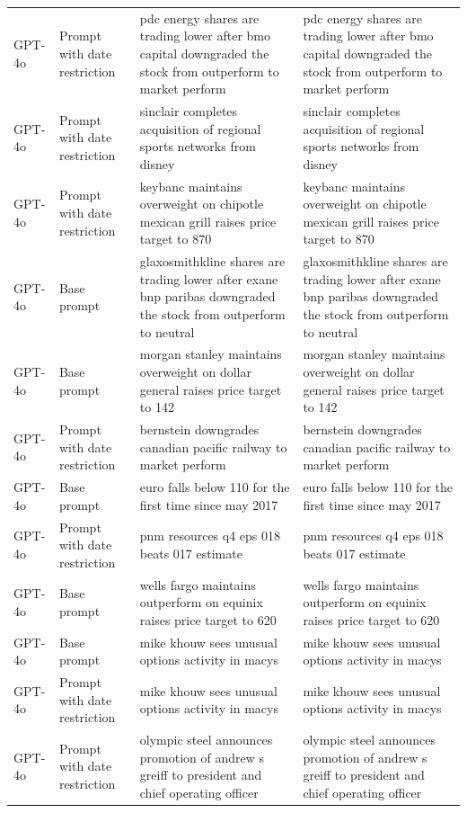 \begin{longtable}{>{\raggedright\arraybackslash}p{1.4cm}>{\raggedright\arraybackslash}p{1.4cm}>{\raggedright\arraybackslash}p{5.5cm}>{\raggedright\arraybackslash}p{5.5cm}}
GPT-4o & Prompt with date restriction & pdc energy shares are trading lower after bmo capital downgraded the stock from outperform to market perform & pdc energy shares are trading lower after bmo capital downgraded the stock from outperform to market perform\\
GPT-4o & Prompt with date restriction & sinclair completes acquisition of regional sports networks from disney & sinclair completes acquisition of regional sports networks from disney\\
GPT-4o & Prompt with date restriction & keybanc maintains overweight on chipotle mexican grill raises price target to 870 & keybanc maintains overweight on chipotle mexican grill raises price target to 870\\
GPT-4o & Base prompt & glaxosmithkline shares are trading lower after exane bnp paribas downgraded the stock from outperform to neutral & glaxosmithkline shares are trading lower after exane bnp paribas downgraded the stock from outperform to neutral\\
GPT-4o & Base prompt & morgan stanley maintains overweight on dollar general raises price target to 142 & morgan stanley maintains overweight on dollar general raises price target to 142\\
GPT-4o & Prompt with date restriction & bernstein downgrades canadian pacific railway to market perform & bernstein downgrades canadian pacific railway to market perform\\
GPT-4o & Base prompt & euro falls below 110 for the first time since may 2017 & euro falls below 110 for the first time since may 2017\\
GPT-4o & Prompt with date restriction & pnm resources q4 eps 018 beats 017 estimate & pnm resources q4 eps 018 beats 017 estimate\\
GPT-4o & Base prompt & wells fargo maintains outperform on equinix raises price target to 620 & wells fargo maintains outperform on equinix raises price target to 620\\
GPT-4o & Base prompt & mike khouw sees unusual options activity in macys & mike khouw sees unusual options activity in macys\\
GPT-4o & Prompt with date restriction & mike khouw sees unusual options activity in macys & mike khouw sees unusual options activity in macys\\
GPT-4o & Prompt with date restriction & olympic steel announces promotion of andrew s greiff to president and chief operating officer & olympic steel announces promotion of andrew s greiff to president and chief operating officer\\

\end{longtable}
